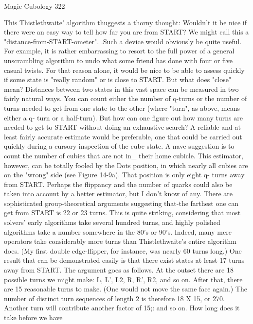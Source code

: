 Magic Cubology                                                                       322

        This Thistlethwaite' algorithm thuggests a thorny thought: Wouldn't it be nice
if there were an easy way to tell how far you are from START? We might call this a
"distance-from-START-ometer". .Such a device would obviously be quite useful. For
example, it is rather embarrassing to resort to the full power of a general
unscrambling algorithm to undo what some friend has done with four or five casual
twists. For that reason alone, it would be nice to be able to assess quickly if some state
is "really random" or is close to START. But what does "close" mean? Distances
between two states in this vast space can be measured in two fairly natural ways. You
can count either the number of q-turns or the number of turns needed to get from one
state to the other (where "turn", as above, means either a q- turn or a half-turn). But
how can one figure out how many turns are needed to get to START without doing an
exhaustive search? A reliable and at least fairly accurate estimate would be preferable,
one that could be carried out quickly during a cursory inspection of the cube state. A
nave suggestion is to count the number of cubies that are not in\_ their home cubicle.
This estimator, however, can be totally fooled by the Dots position, in which nearly
all cubies are on the "wrong" side (see Figure 14-9a). That position is only eight q-
turns away from START. Perhaps the flippancy and the number of quarks could also
be taken into account by a better estimator, but I don't know of any.
        There are sophisticated group-theoretical arguments suggesting that-the
farthest one can get from START is 22 or 23 turns. This is quite striking, considering
that most solvers' early algorithms take several hundred turns, and highly polished
algorithms take a number somewhere in the 80's or 90's. Indeed, many mere operators
take considerably more turns than Thistlethwaite's entire algorithm does. (My first
double edge-flipper, for instance, was nearly 60 turns long.)
        One result that can be demonstrated easily is that there exist states at least 17
turns away from START. The argument goes as follows. At the outset there are 18
possible turns we might make: L, L', L2, R, R', R2, and so on. After that, there are 15
reasonable turns to make. (One would not move the same face again.) The number of
distinct turn sequences of length 2 is therefore 18 X 15, or 270. Another turn will
contribute another factor of 15;: and so on. How long does it take before we have
